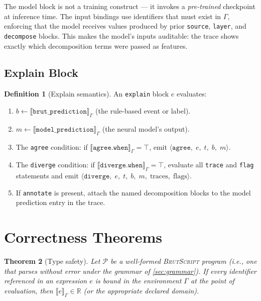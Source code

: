 \documentclass[10pt,twocolumn,a4paper]{article}
\newtheorem{theorem}{Theorem}[section]
\theoremstyle{definition}
\newtheorem{definition}[theorem]{Definition}
\theoremstyle{remark}
\newcommand{\BS}{\textsc{BrutScript}}
\begin{document}
The model block is not a training construct --- it invokes a
\emph{pre-trained} checkpoint at inference time.  The input bindings
use identifiers that must exist in $\Gamma$, enforcing that the model
receives values produced by prior \texttt{source}, \texttt{layer}, and
\texttt{decompose} blocks.  This makes the model's inputs auditable:
the trace shows exactly which decomposition terms were passed as features.

\subsection{Explain Block}

\begin{definition}[Explain semantics]
\label{def:explain}
An \texttt{explain} block $e$ evaluates:
\begin{enumerate}[nosep]
\item $b \leftarrow \llbracket \texttt{brut\_prediction} \rrbracket_\Gamma$
  (the rule-based event or label).
\item $m \leftarrow \llbracket \texttt{model\_prediction} \rrbracket_\Gamma$
  (the neural model's output).
\item The \texttt{agree} condition: if $\llbracket \texttt{agree.when}
  \rrbracket_\Gamma = \top$, emit
  $\langle\texttt{agree},\;e,\;t,\;b,\;m\rangle$.
\item The \texttt{diverge} condition: if $\llbracket \texttt{diverge.when}
  \rrbracket_\Gamma = \top$, evaluate all \texttt{trace} and \texttt{flag}
  statements and emit $\langle\texttt{diverge},\;e,\;t,\;b,\;m,\;
  \mathrm{traces},\;\mathrm{flags}\rangle$.
\item If \texttt{annotate} is present, attach the named decomposition
  blocks to the model prediction entry in the trace.
\end{enumerate}
\end{definition}

\section{Correctness Theorems}
\label{sec:theorems}

\begin{theorem}[Type safety]
\label{thm:type}
Let $\mathcal{P}$ be a well-formed \BS{} program (i.e., one that parses
without error under the grammar of \cref{sec:grammar}).  If every
identifier referenced in an expression $e$ is bound in the environment
$\Gamma$ at the point of evaluation, then $\llbracket e \rrbracket_\Gamma
\in \mathbb{R}$ (or the appropriate declared domain).
\end{theorem}
\end{document}
